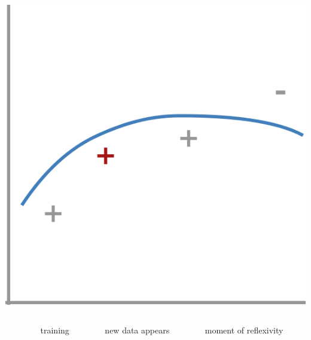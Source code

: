 \documentclass[presentation]{subfiles}
\begin{document}
\begin{frame}[t]
\begin{columns}
\begin{column}{0.16\textwidth}
{\includegraphics[width=\textwidth]{figures/sla_5.png}}


\end{column}



\end{columns}


\begin{columns}
\begin{column}{0.16\textwidth}
\end{column}


\begin{column}{0.16\textwidth}
\begin{center}
  training
\end{center}
\end{column}

\begin{column}{0.16\textwidth}
\begin{center}
  {new data appears}
\end{center}
\end{column}

\begin{column}{0.16\textwidth}
\begin{center}
{moment of reflexivity}
\end{center}
\end{column}


\end{columns}
\end{frame}
\end{document}
